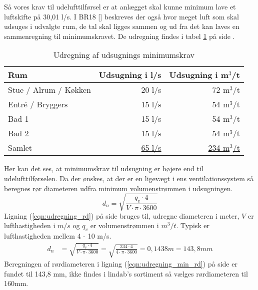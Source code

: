 Så vores krav til udelufttilførsel er at anlægget skal kunne minimum lave et luftskifte på 30,01 l/s.
I BR18 [\cite{BR18:Online}] beskreves der også hvor meget luft som skal udsuges i udvalgte rum, 
de tal skal ligges sammen og ud fra det kan laves en sammenregning til minimumskravet. De udregning findes i tabel \ref{table:samregn_vent_ud} på side \pageref{table:samregn_vent_ud}.
\begin{table}[!h]
    \begin{center}
       \begin{tabular}{|l|r|r|}
           \hline
           Rum & Udsugning i l/s & Udsugning i m$^3$/t \\
           \hline
           Stue / Alrum / Køkken & 20 l/s & 72 m$^3$/t\\
           Entré / Bryggers  & 15 l/s & 54 m$^3$/t\\
           Bad 1             & 15 l/s & 54 m$^3$/t\\
           Bad 2             & 15 l/s & 54 m$^3$/t\\
           \hline
           \hline
           Samlet & \underline{65 l/s} & \underline{234 m$^3$/t} \\
           \hline
       \end{tabular}
   \end{center}
   \caption{Udregning af udsugnings minimumskrav}
   \label{table:samregn_vent_ud}
\end{table}
Her kan det ses, at minimumskrav til udsugning er højere end til udelufttilførselen. 
Da der ønskes, at der er en ligevægt i ens ventilationssystem så beregnes rør diameteren udfra minimum volumenstrømmen i udsugningen.
\begin{equation}\label{eqn:udregning_rd}
d_{n} = \sqrt{ \frac{q_{v} \cdot 4}{V\cdot\pi\cdot3600}}
\end{equation}
Ligning (\ref{eqn:udregning_rd}) på side \pageref{eqn:udregning_rd} bruges til, udregne diameteren i meter, $V$ er lufthastigheden i $m/s$ og $q_v$ er volumenstrømmen i $m^{3}/t$.
Typisk er lufthastigheden mellem 4 - 10 m/s. 
\begin{align} \label{eqn:udregning_min_rd} 
    d_{n}       &= \sqrt{ \frac{q_{v} \cdot 4}{V\cdot\pi\cdot3600}} = \sqrt{ \frac{234 \cdot 4}{4\cdot\pi\cdot3600}} = 0,1438 m = 143,8 mm
\end{align}
Beregningen af rørdiameteren i ligning (\ref{eqn:udregning_min_rd}) på side \pageref{eqn:udregning_min_rd} er fundet til 143,8 mm, 
ikke findes i lindab's sortiment så vælges rørdiameteren til 160mm.

